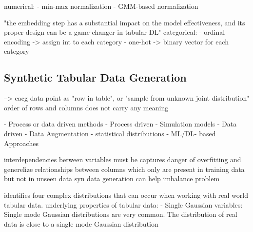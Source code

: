 numerical:
- min-max normalization
- GMM-based normalization


"the embedding step has a substantial impact on the model effectiveness, and its proper design can be a game-changer in tabular DL"
categorical:
- ordinal encoding -> assign int to each category
- one-hot -> binary vector for each category











\subsection{Synthetic Tabular Data Generation}

--> eacg data point as "row in table", or "sample from unknown joint distribution"
order of rows and columns does not carry any meaning \cite{somepalli2021SAINTImprovedNeural}


- Process or data driven methods \cite{goncalves2020GenerationEvaluationSynthetic}
    - Process driven
        - Simulation models \cite{kowalczyk2022TaxonomyUseSynthetic}
    - Data driven
        - Data Augmentation \cite{kowalczyk2022TaxonomyUseSynthetic}
        - statistical distributions \cite{kowalczyk2022TaxonomyUseSynthetic}
        - ML/DL- based Approaches \cite{kowalczyk2022TaxonomyUseSynthetic}

interdependencies between variables must be captures \cite{lederrey2022DATGANIntegratingExperta}
danger of overfitting and generelize relationships between columns which only are present in training data but not in unseen data \cite{lederrey2022DATGANIntegratingExperta}
syn data generation can help imbalance problem \cite{borisov2022DeepNeuralNetworks}



\cite{zhao2022CTABGANEnhancingTabular} identifies four complex distributions that can occur when working with real world tabular data.
underlying properties of tabular data: \cite{zhao2022CTABGANEnhancingTabular}
- Single Gaussian variables:
    Single mode Gaussian distributions are very common.
    The distribution of real data is close to a single mode Gaussian distribution

